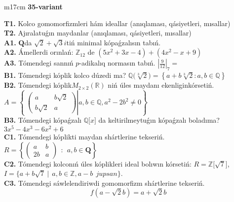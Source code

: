 \documentclass{article}
\begin{document}
\begin{tabular}{m{17cm}}
\textbf{35-variant}
\newline

\textbf{T1.} Kolco gomomorfizmleri hám ideallar (anıqlaması, qásiyetleri, mısallar) \\
\textbf{T2.} Ajıralatuǵın maydanlar (anıqlaması, qásiyetleri, mısallar) \\
\textbf{A1.} \(\mathbf{Q}\)da \(\sqrt{2} + \sqrt{3}i\)tiń minimal kópaǵzalısın tabıń. \\
\textbf{A2.} Ámellerdi orınlań: \(\mathbb{Z}_{12}\) de \(\left( 5x^{2} + 3x - 4 \right) + \left( 4x^{2} - x + 9 \right)\) \\
\textbf{A3.} Tómendegi sannıń \(p\)-adikalıq normasın tabıń. \(|\frac{9}{12}|_{7} =\) \\
\textbf{B1.} Tómendegi kóplik kolco dúzedi ma? \(\mathbb{Q(}\sqrt[3]{2}) = \left\{ a + b\sqrt[3]{2}:a,b \in \mathbb{Q} \right\}\) \\
\textbf{B2.} Tómendegi kóplik\(M_{2 \times 2}\left( \mathbb{R} \right)\) niń úles maydanı ekenliginkórsetiń. \(A = \left\{ \left. \ \begin{pmatrix}
a & b\sqrt{2} \\
b\sqrt{2} & a
\end{pmatrix} \right|a,b\mathbb{\in Q},a^{2} - 2b^{2} \neq 0 \right\}\) \\
\textbf{B3.} Tómendegi kópaǵzalı \(\mathbb{Q\lbrack}x\rbrack\) da keltirilmeytuǵın kópaǵzalı boladıma? \(3x^{5} - 4x^{3} - 6x^{2} + 6\) \\
\textbf{C1.} Tómendegi kóplikti maydan shártlerine tekseriń. \(R = \left\{ \begin{pmatrix}
a & b \\
2b & a
\end{pmatrix}\ \ :\ \ a,b \in \mathbf{Q} \right\}\) \\
\textbf{C2.} Tómendegi kolconıń úles kóplikleri ideal bolıwın kórsetiń:
\(R\mathbb{= Z\lbrack}\sqrt{7}\rbrack\), \(I = \{ a + b\sqrt{7}\ |\ \ a,b \in \mathbb{Z,}a - b\ \ jupsan\}\). \\
\textbf{C3.} Tómendegi sáwlelendiriwdi gomomorfizm shártlerine tekseriń.
\[f\left( a - \sqrt{2}b \right) = a + \sqrt{2}b\] \\

\end{tabular}
\vspace{1cm}
\end{document}
